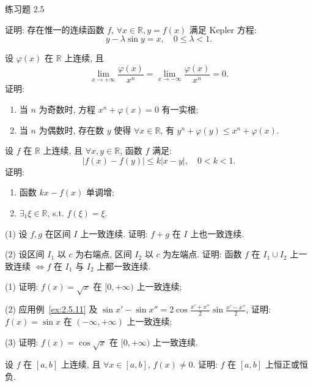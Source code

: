 \begin{exblock}{练习题 2.5}
\item 证明: 存在惟一的连续函数 $f$, $\forall x \in \mathbb{R}, y = f(x)$ 满足 Kepler 方程:
  \[
  y - \lambda\sin y = x, \quad 0 \leqslant \lambda < 1.
\]

\item 设 $\varphi(x)$ 在 $\mathbb{R}$ 上连续, 且
  \[
  \lim_{x \to +\infty} \frac{\varphi(x)}{x^n} = \lim_{x \to -\infty} \frac{\varphi(x)}{x^n} = 0.
\]
  证明:
  \begin{enumerate}[label=(\arabic*)]
    \item 当 $n$ 为奇数时, 方程 $x^n + \varphi(x) = 0$ 有一实根;
    \item 当 $n$ 为偶数时, 存在数 $y$ 使得 $\forall x \in \mathbb{R}$, 有 $y^n + \varphi(y) \leqslant x^n + \varphi(x)$.
  \end{enumerate}

\item 设 $f$ 在 $\mathbb{R}$ 上连续, 且 $\forall x, y \in \mathbb{R}$, 函数 $f$ 满足:
  \[
  |f(x) - f(y)| \leqslant k|x - y|, \quad 0 < k < 1.
\]
  证明:
  \begin{enumerate}[label=(\arabic*)]
    \item 函数 $kx - f(x)$ 单调增;
    \item $\exists_1 \xi \in \mathbb{R}$, s.t. $f(\xi) = \xi$.
  \end{enumerate}

\item (1) 设 $f, g$ 在区间 $I$ 上一致连续. 证明: $f + g$ 在 $I$ 上也一致连续.

(2) 设区间 $I_1$ 以 $c$ 为右端点, 区间 $I_2$ 以 $c$ 为左端点. 证明: 函数 $f$ 在 $I_1 \cup I_2$ 上一致连续 $\iff f$ 在 $I_1$ 与 $I_2$ 上都一致连续.

\item (1) 证明: $f(x) = \sqrt{x}$ 在 $[0,+\infty)$ 上一致连续;

(2) 应用例~\ref{ex:2.5.11} 及 $\sin x' - \sin x'' = 2\cos\frac{x' + x''}{2}\sin\frac{x' - x''}{2}$, 证明: $f(x) = \sin x$ 在 $(-\infty, +\infty)$ 上一致连续;

(3) 证明: $f(x) = \cos\sqrt{x}$ 在 $[0,+\infty)$ 上一致连续.

\item 设 $f$ 在 $[a,b]$ 上连续, 且 $\forall x \in [a,b]$, $f(x) \neq 0$. 证明: $f$ 在 $[a,b]$ 上恒正或恒负.
\end{exblock}

